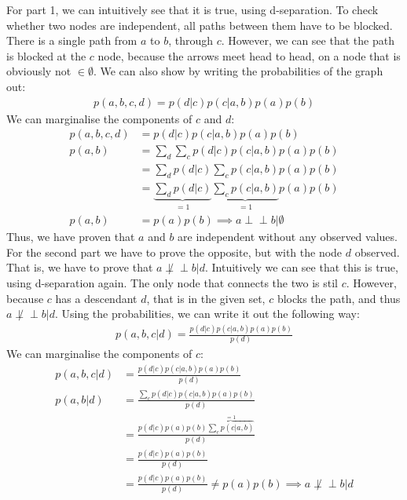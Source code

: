 For part 1, we can intuitively see that it is true, using d-separation. To check whether two nodes are independent, all paths between them have to be blocked. There is a single path from $a$ to $b$, through $c$. However, we can see that the path is blocked at the $c$ node, because the arrows meet head to head, on a node that is obviously not $\in \emptyset$. We can also show by writing the probabilities of the graph out:
\begin{align*}
  p(a,b,c,d)= p(d|c)p(c|a,b)p(a)p(b)
\end{align*}
We can marginalise the components of $c$ and $d$:
\begin{align*}
  p(a,b,c,d) &= p(d|c)p(c|a,b)p(a)p(b) \\
  p(a,b) &= \sum_d\sum_c p(d|c)p(c|a,b)p(a)p(b) \\
  &= \sum_d p(d|c) \sum_c p(c|a,b)p(a)p(b) \\
  &= \underbrace{\sum_d p(d|c)}_{=1} \underbrace{\sum_c p(c|a,b)}_{=1}p(a)p(b) \\
  p(a,b) &= p(a)p(b) \implies a \perp \!\!\! \perp b | \emptyset
\end{align*}
Thus, we have proven that $a$ and $b$ are independent without any observed values. For the second part we have to prove the opposite, but with the node $d$ observed. That is, we have to prove that $a \not \perp \!\!\! \perp b | d$. Intuitively we can see that this is true, using d-separation again. The only node that connects the two is stil $c$. However, because $c$ has a descendant $d$, that is in the given set, $c$ blocks the path, and thus $a \not \perp \!\!\! \perp b | d$. Using the probabilities, we can write it out the following way:
\begin{align*}
  p(a,b,c|d) = \frac{p(d|c)p(c|a,b)p(a)p(b)}{p(d)}
\end{align*}
We can marginalise the components of $c$:
\begin{align*}
  p(a,b,c|d) &= \frac{p(d|c)p(c|a,b)p(a)p(b)}{p(d)} \\
  p(a,b|d) &= \frac{\sum_c p(d|c)p(c|a,b)p(a)p(b)}{p(d)} \\
  &= \frac{p(d|c)p(a)p(b)\overbrace{\sum_c p(c|a,b)}^{=1}}{p(d)} \\
  &= \frac{p(d|c)p(a)p(b)}{p(d)} \\
  &= \frac{p(d|c)p(a)p(b)}{p(d)} \neq p(a)p(b) \implies a \not \perp \!\!\! \perp b | d
\end{align*}
